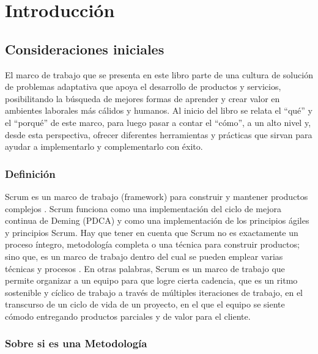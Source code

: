 \chapter{Introducción}

\section{Consideraciones iniciales}

El marco de trabajo que se presenta en este libro parte de una cultura de solución de problemas adaptativa que apoya el desarrollo de productos y servicios, posibilitando la búsqueda de mejores formas de aprender y crear valor en ambientes laborales más cálidos y humanos. Al inicio del libro se relata el “qué” y el “porqué” de este marco, para luego pasar a contar el “cómo”, a un alto nivel y, desde esta perspectiva, ofrecer diferentes herramientas y prácticas que sirvan para ayudar a implementarlo y complementarlo con éxito.

\subsection{Definición}

Scrum es un marco de trabajo (framework) para construir y mantener productos complejos \cite{SBOK-2013} \cite{Scrum-Alliance-2015}. 
Scrum funciona como una implementación del ciclo de mejora continua de Deming (PDCA) y como una implementación de los principios ágiles y principios Scrum. Hay que tener en cuenta que Scrum no es exactamente un proceso íntegro, metodología completa o una técnica para construir productos; sino que, es un marco de trabajo dentro del cual se pueden emplear varias técnicas y procesos \cite{Agile-Atlas-2012}. En otras palabras, Scrum es un marco de trabajo que permite organizar a un equipo para que logre cierta cadencia, que es un ritmo sostenible y cíclico de trabajo a través de múltiples iteraciones de trabajo, en el transcurso de un ciclo de vida de un proyecto, en el que el equipo se siente cómodo entregando productos parciales y de valor para el cliente.

\subsection{Sobre si es una Metodología}

